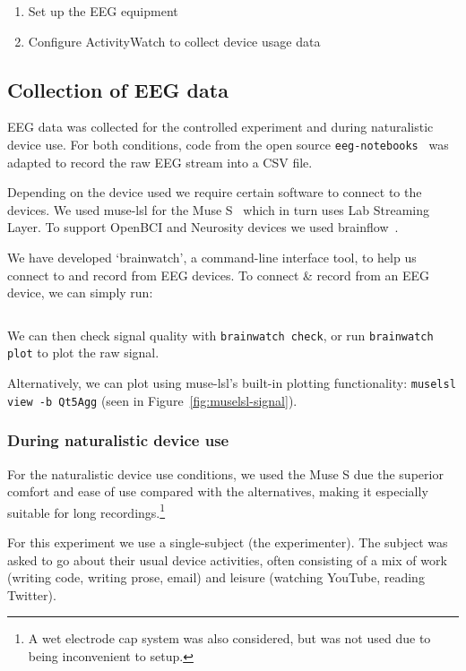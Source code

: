\begin{enumerate}
    \item Set up the EEG equipment
    \item Configure ActivityWatch to collect device usage data
\end{enumerate}

    \subsection{Collection of EEG data}

        EEG data was collected for the controlled experiment and during naturalistic device use. For both conditions, code from the open source \texttt{eeg-notebooks}~\cite{barachant_eeg-notebooks_2020} was adapted to record the raw EEG stream into a CSV file.

        Depending on the device used we require certain software to connect to the devices. We used muse-lsl for the Muse S~\cite{muse-lsl} which in turn uses Lab Streaming Layer. To support OpenBCI and Neurosity devices we used brainflow~\cite{noauthor_brainflow_2020}.

        We have developed `brainwatch', a command-line interface tool, to help us connect to and record from EEG devices. To connect \& record from an EEG device, we can simply run:

        \inputminted{bash}{figures/brainwatch-example.txt}

        We can then check signal quality with \texttt{brainwatch check}, or run \texttt{brainwatch plot} to plot the raw signal.

        Alternatively, we can plot using muse-lsl's built-in plotting functionality: \texttt{muselsl view -b Qt5Agg} (seen in Figure~\ref{fig:muselsl-signal}).

        \subsubsection*{During naturalistic device use}\label{section:collect-eeg-naturalistic}

            For the naturalistic device use conditions, we used the Muse S due the superior comfort and ease of use compared with the alternatives, making it especially suitable for long recordings.\footnote{A wet electrode cap system was also considered, but was not used due to being inconvenient to setup.}

            For this experiment we use a single-subject (the experimenter). The subject was asked to go about their usual device activities, often consisting of a mix of work (writing code, writing prose, email) and leisure (watching YouTube, reading Twitter).
            
